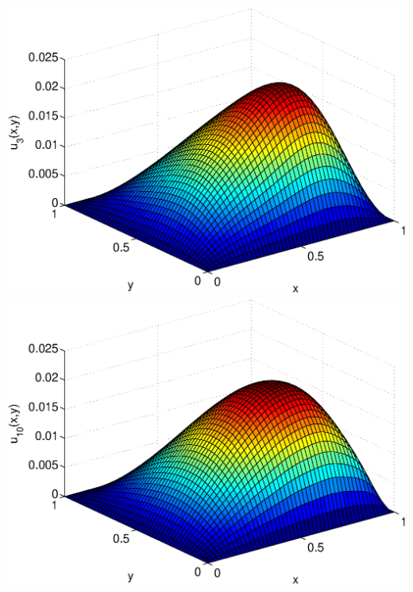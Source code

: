 \begin{solution}
\begin{enumerate}
\begin{center}
          \includegraphics[scale=0.37]{twoD3}\quad
          \includegraphics[scale=0.37]{twoD10}
      \end{center}


\end{enumerate}
\end{solution}